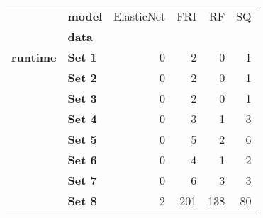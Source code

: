\begin{tabular}{llrrrr}
\toprule
        & \textbf{model} &  ElasticNet &  FRI &   RF &  SQ \\
{} & \textbf{data} &             &      &      &     \\
\midrule
\textbf{runtime} & \textbf{Set 1} &           0 &    2 &    0 &   1 \\
        & \textbf{Set 2} &           0 &    2 &    0 &   1 \\
        & \textbf{Set 3} &           0 &    2 &    0 &   1 \\
        & \textbf{Set 4} &           0 &    3 &    1 &   3 \\
        & \textbf{Set 5} &           0 &    5 &    2 &   6 \\
        & \textbf{Set 6} &           0 &    4 &    1 &   2 \\
        & \textbf{Set 7} &           0 &    6 &    3 &   3 \\
        & \textbf{Set 8} &           2 &  201 &  138 &  80 \\
\bottomrule
\end{tabular}
